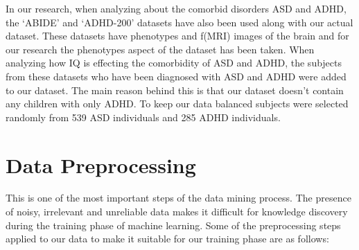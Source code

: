 \newline
In our research, when analyzing about the comorbid disorders ASD and ADHD, the `ABIDE' and `ADHD-200' datasets have also been used along with our actual dataset. These datasets have phenotypes and f(MRI) images of the brain and for our research the phenotypes aspect of the dataset has been taken. When analyzing how IQ is effecting the comorbidity of ASD and ADHD, the subjects from these datasets who have been diagnosed with ASD and ADHD were added to our dataset. The main reason behind this is that our dataset doesn’t contain any children with only ADHD. To keep our data balanced subjects were selected randomly from 539 ASD individuals and 285 ADHD individuals.
\section{Data Preprocessing}
This is one of the most important steps of the data mining process. The presence of noisy, irrelevant and unreliable data makes it difficult for knowledge discovery during the training phase of machine learning. Some of the preprocessing steps applied to our data to make it suitable for our training phase are as follows: 
